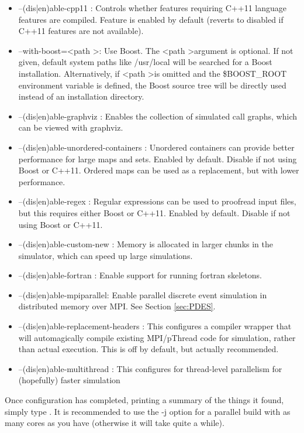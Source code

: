 \begin{itemize}
\item --(dis|en)able-cpp11 : Controls whether features requiring C++11 language features are compiled. Feature is enabled by default (reverts to disabled if C++11 features are not available).
\item --with-boost=\textless path \textgreater: Use Boost.
The \textless path \textgreater argument is optional. If not given, default system paths like /usr/local will be searched for a Boost installation.
Alternatively, if \textless path \textgreater is omitted and the \$BOOST\_ROOT environment variable is defined, the Boost source tree will be directly used
instead of an installation directory.
\item --(dis|en)able-graphviz : Enables the collection of simulated call graphs, which can be viewed with graphviz.
\item --(dis|en)able-unordered-containers : Unordered containers can provide better performance for large maps and sets.
Enabled by default. Disable if not using Boost or C++11. Ordered maps can be used as a replacement, but with lower performance.
\item --(dis|en)able-regex : Regular expressions can be used to proofread input files, but this requires either Boost or C++11.
Enabled by default. Disable if not using Boost or C++11.
\item --(dis|en)able-custom-new : Memory is allocated in larger chunks in the simulator, which can speed up large simulations.
\item --(dis|en)able-fortran : Enable support for running fortran skeletons.
\item --(dis|en)able-mpiparallel: Enable parallel discrete event simulation in distributed memory over MPI.  See Section \ref{sec:PDES}.
\item --(dis|en)able-replacement-headers : This configures a compiler wrapper that will automagically compile existing MPI/pThread code for simulation, rather than actual execution. This is off by default, but actually recommended.
\item --(dis|en)able-multithread : This configures for thread-level parallelism for (hopefully) faster simulation
\end{itemize}

Once configuration has completed, printing a summary of the things it found, simply type .  
It is recommended to use the -j option for a parallel build with as many cores as you have (otherwise it will take quite a while).  

